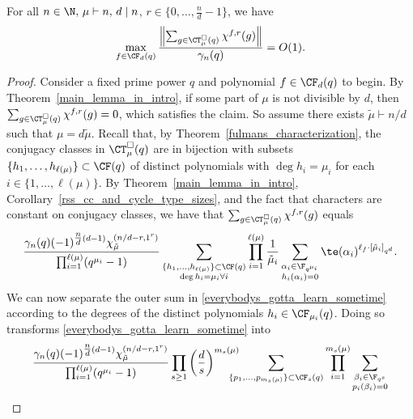 \begin{lemma}
\label{char_sum_norm_lemma}
For all \(n \in \N, \, \mu \vdash n, \, d \mid n\), \(r \in \{0,\ldots,\tfrac{n}{d}-1\}\), we have
\begin{equation}
\max_{f \in \CF_d(q)}
\frac{\left \| \sum_{g \in \CT^\Box_\mu(q)} \chi^{f,r}(g) \right \|}{\gamma_n(q)}
=
O(1).
\end{equation}
\end{lemma}

\begin{proof}
Consider a fixed prime power \(q\) and polynomial \(f \in \CF_d (q)\) to begin.
By Theorem~\ref{main_lemma_in_intro}, if some part of \(\mu\) is not divisible by \(d\), then \(\sum_{g \in \CT_\mu^\Box (q)} \chi^{f,r}(g) = 0\), which satisfies the claim.
So assume there exists \(\tilde{\mu} \vdash n/d\) such that \(\mu = d \tilde{\mu}\).
Recall that, by Theorem~\ref{fulmans_characterization}, the conjugacy classes in \(\CT_\mu^\Box (q)\) are in bijection with subsets \(\{h_1,\ldots,h_{\ell(\mu)}\} \subset \CF (q)\) of distinct polynomials with \(\deg h_i = \mu_i\) for each \(i \in \{1,\ldots,\ell(\mu)\}\).
By Theorem~\ref{main_lemma_in_intro}, Corollary~\ref{rss_cc_and_cycle_type_sizes}, and the fact that characters are constant on conjugacy classes, we have that
\(
\sum_{g \in \CT_\mu^\Box (q)}
\chi^{f,r} (g)\)
equals
\begin{equation}
\label{everybodys_gotta_learn_sometime}
\frac{\gamma_n(q) (-1)^{\tfrac{n}{d}(d-1)} \chi^{(n/d-r,1^r)}_{\tilde{\mu}}}{\prod_{i=1}^{\ell(\mu)} (q^{\mu_i}-1)}
\sum_{ \substack{\{ h_1,\ldots,h_{\ell(\mu)}\} \subset \CF (q) \\ \deg h_i = \mu_i \forall i} }
\prod_{i=1}^{\ell(\mu)}
\frac{1}{\tilde{\mu}_i}
\sum_{\substack{\alpha_i \in \F_{q^{\mu_i}} \\ h_i(\alpha_i) = 0}}
\te(\alpha_i)^{\ell_f \cdot [\tilde{\mu}_i]_{q^d}}.
\end{equation}
We can now separate the outer sum in \eqref{everybodys_gotta_learn_sometime} according to the degrees of the distinct polynomials \(h_i \in \CF_{\mu_i} (q)\).
Doing so transforms \eqref{everybodys_gotta_learn_sometime} into
\begin{equation}
\frac{\gamma_n(q) (-1)^{\tfrac{n}{d}(d-1)} \chi^{(n/d-r,1^r)}_{\tilde{\mu}}}{\prod_{i=1}^{\ell(\mu)} (q^{\mu_i}-1)}
\prod_{s \geq 1}
\left (
\frac{d}{s}
\right )^{m_s(\mu)}
\hspace{-0.4cm} \sum_{ \{p_1,\ldots,p_{m_s(\mu)}\} \subset \CF_s (q) }
\prod_{i=1}^{m_s(\mu)}
\sum_{\substack{\beta_i \in \F_{q^s} \\ p_i(\beta_i)=0}}

\end{equation}
\end{proof}
